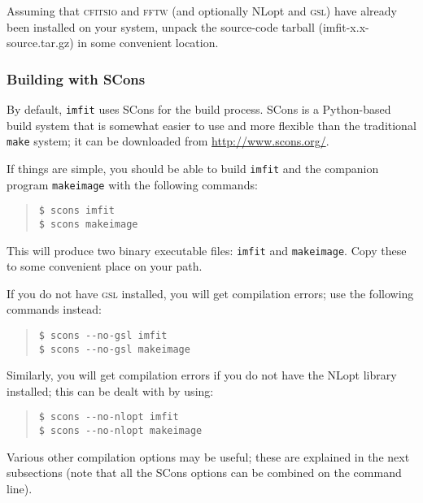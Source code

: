 \documentclass[10pt,a4paper,article]{memoir}
\newcommand{\imfit}{\texttt{imfit}}
\newcommand{\makeimage}{\texttt{makeimage}}
\begin{document}
Assuming that \textsc{cfitsio} and \textsc{fftw} (and optionally NLopt and \textsc{gsl}) have already been installed
on your system, unpack the source-code tarball (imfit-x.x-source.tar.gz) in some convenient
location.

\subsubsection{Building with SCons}

By default, \imfit{} uses SCons for the build process. SCons is a Python-based build system
that is somewhat easier to use and more flexible than the traditional \texttt{make}
system; it can be downloaded from \url{http://www.scons.org/}.

If things are simple, you should be able to build \imfit{} and the companion
program \makeimage{} with the following commands:
\begin{quote}
\texttt{\$ scons imfit} \\
\texttt{\$ scons makeimage}
\end{quote}
This will produce two binary executable files: \imfit{} and \makeimage{}. Copy
these to some convenient place on your path.

If you do not have \textsc{gsl} installed, you will get compilation errors; use the following
commands instead:
\begin{quote}
\verb+$ scons --no-gsl imfit+ \\
\verb+$ scons --no-gsl makeimage+
\end{quote}

Similarly, you will get compilation errors if you do not have the NLopt library installed;
this can be dealt with by using:
\begin{quote}
\verb+$ scons --no-nlopt imfit+ \\
\verb+$ scons --no-nlopt makeimage+
\end{quote}

Various other compilation options may be useful; these are explained in the next
subsections (note that all the SCons options can be combined on the command
line).


%
%
\end{document}
